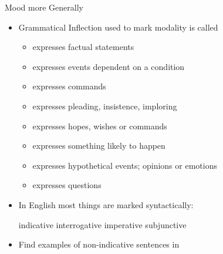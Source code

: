 

\begin{frame}{Mood more Generally}
\begin{itemize}
\item Grammatical Inflection used to mark modality is called 
  \begin{itemize}
  \item {} expresses factual statements
  \item {} expresses events dependent on a condition
  \item {} expresses commands
  \item {} expresses pleading, insistence, imploring
  \item {} expresses hopes, wishes or commands 
  \item {} expresses something likely to happen
  \item {} expresses  hypothetical events; opinions or emotions
  \item {} expresses questions
\end{itemize}
\item In English most things are marked syntactically: \vspace*{-1ex}
    \begin{exe}
      \ex  {}  \hfill indicative
      \ex  {} \hfill interrogative
    \ex {} \hfill imperative
    \ex {} \hfill subjunctive
  \end{exe}
\item [?] Find examples of non-indicative sentences in \Story{}\task
\end{itemize}

\end{frame}

